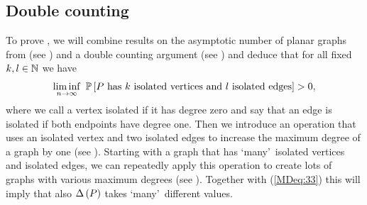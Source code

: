 \subsection{Double counting}\label{MDsub:strategy_dense}
To prove , we will combine results on the asymptotic number of planar graphs from \cite{GimenezNoy2009} (see ) and a double counting argument (see ) and deduce that for all fixed $k,l\in\mathbb{N}$ we have 
\begin{align}\label{MDeq:33}
	\liminf_{n\to \infty}~ \mathbb{P}\left[P \text{ has }k \text{ isolated vertices and }l \text{ isolated edges}\right]>0,
\end{align}
where we call a vertex isolated if it has degree zero and say that an edge is isolated if both endpoints have degree one. Then we introduce an operation that uses an isolated vertex and two isolated edges to increase the maximum degree of a graph by one (see ). Starting with a graph that has \lq many\rq\ isolated vertices and isolated edges, we can repeatedly apply this operation to create lots of graphs with various maximum degrees (see ). Together with (\ref{MDeq:33}) this will imply that also $\Delta\left(P\right)$ takes \lq many\rq\ different values.

